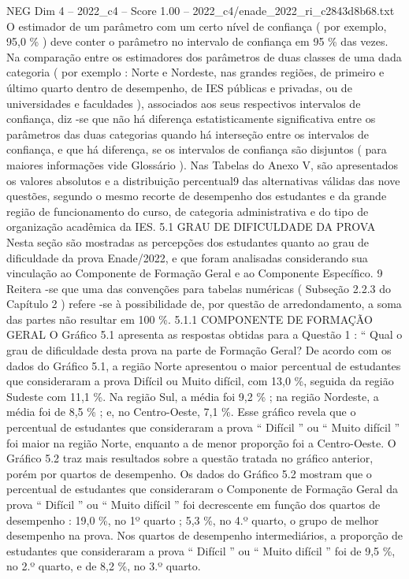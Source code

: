 \begin{textsample}{NEG Dim 4 – 2022\_c4 – Score 1.00 – 2022\_c4/enade\_2022\_ri\_c2843d8b68.txt}
O estimador de um parâmetro com um certo nível de confiança ( por exemplo, 95,0 \% ) deve conter o parâmetro no intervalo de confiança em 95 \% das vezes.
Na comparação entre os estimadores dos parâmetros de duas classes de uma dada categoria ( por exemplo : Norte e Nordeste, nas grandes regiões, de primeiro e último quarto dentro de desempenho, de IES públicas e privadas, ou de universidades e faculdades ), associados aos seus respectivos intervalos de confiança, diz -se que não há diferença estatisticamente significativa entre os parâmetros das duas categorias quando há interseção entre os intervalos de confiança, e que há diferença, se os intervalos de confiança são disjuntos ( para maiores informações vide Glossário ).
Nas Tabelas do Anexo V, são apresentados os valores absolutos e a distribuição percentual9 das alternativas válidas das nove questões, segundo o mesmo recorte de desempenho dos estudantes e da grande região de funcionamento do curso, de categoria administrativa e do tipo de organização acadêmica da IES. 5.1 GRAU DE DIFICULDADE DA PROVA Nesta seção são mostradas as percepções dos estudantes quanto ao grau de dificuldade da prova Enade/2022, e que foram analisadas considerando sua vinculação ao Componente de Formação Geral e ao Componente Específico. 9 Reitera -se que uma das convenções para tabelas numéricas ( Subseção 2.2.3 do Capítulo 2 ) refere -se à possibilidade de, por questão de arredondamento, a soma das partes não resultar em 100 \%. 5.1.1 COMPONENTE DE FORMAÇÃO GERAL O Gráfico 5.1 apresenta as respostas obtidas para a Questão 1 : “ Qual o grau de dificuldade desta prova na parte de Formação Geral?
De acordo com os dados do Gráfico 5.1, a região Norte apresentou o maior percentual de estudantes que consideraram a prova Difícil ou Muito difícil, com 13,0 \%, seguida da região Sudeste com 11,1 \%.
Na região Sul, a média foi 9,2 \% ; na região Nordeste, a média foi de 8,5 \% ; e, no Centro-Oeste, 7,1 \%.
Esse gráfico revela que o percentual de estudantes que consideraram a prova “ Difícil ” ou “ Muito difícil ” foi maior na região Norte, enquanto a de menor proporção foi a Centro-Oeste.
O Gráfico 5.2 traz mais resultados sobre a questão tratada no gráfico anterior, porém por quartos de desempenho.
Os dados do Gráfico 5.2 mostram que o percentual de estudantes que consideraram o Componente de Formação Geral da prova “ Difícil ” ou “ Muito difícil ” foi decrescente em função dos quartos de desempenho : 19,0 \%, no 1º quarto ; 5,3 \%, no 4.º quarto, o grupo de melhor desempenho na prova.
Nos quartos de desempenho intermediários, a proporção de estudantes que consideraram a prova “ Difícil ” ou “ Muito difícil ” foi de 9,5 \%, no 2.º quarto, e de 8,2 \%, no 3.º quarto.

\end{textsample}
